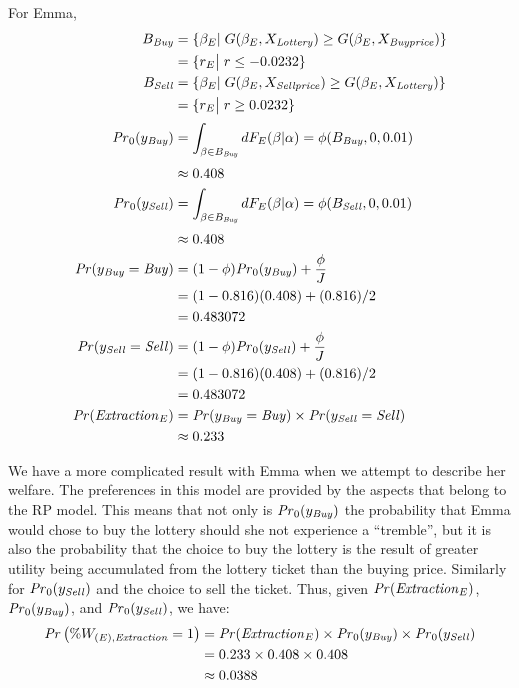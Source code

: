 \noindent For Emma,
\begin{align}
	\label{eq:Emma}
	\begin{split}
		B_{\mathit{Buy}} &= \{ \beta_E |\; G(\beta_E,X_{\mathit{Lottery}}) \geq G(\beta_E,X_{\mathit{Buy price}})\}\\
		&= \{ r_E \big|\; r \leq -0.0232 \} \\
		B_{\mathit{Sell}} &= \{ \beta_E |\; G(\beta_E,X_{\mathit{Sell price}}) \geq G(\beta_E,X_{\mathit{Lottery}})\}\\
		&= \{ r_E \big|\; r \geq 0.0232 \} \\[0.5ex]
		{\ensuremath{\mathit{Pr}}}_0(y_{\mathit{Buy}}) &= \int_{\beta \in B_{\mathit{Buy}}} dF_E(\beta|\alpha) = \phi(B_{\mathit{Buy}},0,0.01)\\[0.5ex]
		&\approx 0.408 \\
		{\mathit{Pr}}_0(y_{\mathit{Sell}}) &= \int_{\beta \in B_{\mathit{Buy}}} dF_E(\beta|\alpha) = \phi(B_{\mathit{Sell}},0,0.01)\\[0.5ex]
		&\approx 0.408 \\
		{\mathit{Pr}}(y_{\mathit{Buy}}=\mathit{Buy}) &= (1-\phi) {\mathit{Pr}}_0(y_{\mathit{Buy}}) + \frac{\phi}{J}\\
		&=(1-0.816)(0.408) + (0.816)/2\\
		&= 0.483072\\
		{\mathit{Pr}}(y_{\mathit{Sell}}=\mathit{Sell}) &= (1-\phi) {\mathit{Pr}}_0(y_{\mathit{Sell}}) + \frac{\phi}{J}\\
		&=(1-0.816)(0.408) + (0.816)/2\\
		&= 0.483072\\
		{\mathit{Pr}}(\mathit{Extraction}_E) &= {\mathit{Pr}}(y_{\mathit{Buy}} = \mathit{Buy}) \times {\ensuremath{\mathit{Pr}}}(y_{\mathit{Sell}} = \mathit{Sell})\\
		&\approx 0.233
	\end{split}
\end{align}

We have a more complicated result with Emma when we attempt to describe her welfare. 
The preferences in this model are provided by the aspects that belong to the RP model.
This means that not only is ${\mathit{Pr}}_0(y_{\mathit{Buy}})$ the probability that Emma would chose to buy the lottery should she not experience a \enquote{tremble}, but it is also the probability that the choice to buy the lottery is the result of greater utility being accumulated from the lottery ticket than the buying price.
Similarly for ${\mathit{Pr}}_0(y_{\mathit{Sell}})$ and the choice to sell the ticket.
Thus, given ${\mathit{Pr}}(\mathit{Extraction}_E)$, ${\mathit{Pr}}_0(y_{\mathit{Buy}})$, and ${\mathit{Pr}}_0(y_{\mathit{Sell}})$, we have:
\begin{align}
	\begin{split}
		{\ensuremath{\mathit{Pr}}}\left(\% W_{(E),\mathit{Extraction}} = 1\right) &= {\mathit{Pr}}(\mathit{Extraction}_E) \times {\ensuremath{\mathit{Pr}}}_0(y_{\mathit{Buy}}) \times {\ensuremath{\mathit{Pr}}}_0(y_{\mathit{Sell}})\\
		&= 0.233 \times 0.408 \times 0.408\\
		&\approx 0.0388
	\end{split}
\end{align}

